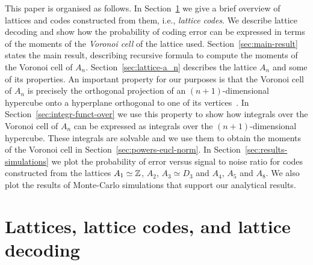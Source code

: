 \documentclass[journal, onecolumn, 11pt]{IEEEtran}
\begin{document}
This paper is organised as follows.  In Section~\ref{sec:latt-latt-codes} we give a brief overview of lattices and codes constructed from them, i.e., \emph{lattice codes}.  We describe lattice decoding and show how the probability of coding error can be expressed in terms of the moments of the \emph{Voronoi cell} of the lattice used.  Section~\ref{sec:main-result} states the main result, describing recursive formula to compute the moments of the Voronoi cell of $A_n$.  Section~\ref{sec:lattice-a_n} describes the lattice $A_n$ and some of its properties.  An important property for our purposes is that the Voronoi cell of $A_n$ is precisely the orthogonal projection of an $(n+1)$-dimensional hypercube onto a hyperplane orthogonal to one of its vertices~\cite{McKilliam2009CoxeterLattices,McKilliam2010thesis}.
In Section~\ref{sec:integr-funct-over} we use this property to show how integrals over the Voronoi cell of $A_n$ can be expressed as integrals over the $(n+1)$-dimensional hypercube. These integrals are solvable and we use them to obtain the moments of the Voronoi cell in Section~\ref{sec:powers-eucl-norm}.  In Section~\ref{sec:results-simulations} we plot the probability of error versus signal to noise ratio for codes constructed from the lattices $A_1 \simeq {\mathbb Z}$, $A_2$, $A_3 \simeq D_3$ and $A_4$, $A_5$ and $A_8$.  We also plot the results of Monte-Carlo simulations that support our analytical results.




\section{Lattices, lattice codes, and lattice decoding} \label{sec:latt-latt-codes}
\end{document}
